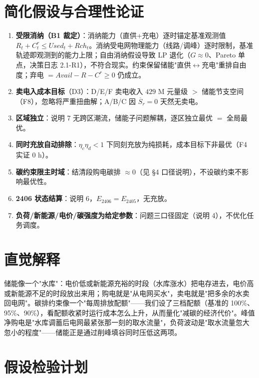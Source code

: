 \documentclass{internal-report}
\begin{document}
\section{简化假设与合理性论证}

\begin{enumerate}
  \item \textbf{受限消纳（B1 裁定）}：消纳能力（直供+充电）逐时锚定基准观测值 $R_t+C^r_t \le Used_t+Rch_t$。消纳受电网物理能力（线路/调峰）逐时限制，基准轨迹即观测到的能力上限；自由消纳假设导致 LP 退化（$G\approx0$、Pareto 单点，决策日志 2.1-R1），不符合现实。约束保留储能"直供$\leftrightarrow$充电"重排自由度；弃电 $=Avail-R-C^r\ge0$ 仍成立。
  \item \textbf{卖电入成本目标}（D3）：D/E/F 卖电收入 $429$ M 元量级 $>$ 储能节支空间（F8），忽略将严重扭曲解；A/B/C 因 $\overline{S}_r=0$ 天然无卖电。
  \item \textbf{区域独立}：说明 7 无跨区潮流，储能子问题解耦，逐区独立最优 $=$ 全局最优。
  \item \textbf{同时充放自动排除}：$\eta_c\eta_d<1$ 下同刻充放为纯损耗，成本目标下非最优（F4 实证 0 h）。
  \item \textbf{碳约束限主时域}：结清段购电碳排 $\approx 0$（见 \S4 口径说明），不设碳约束不影响最优性。
  \item \textbf{2406 状态结算}：说明 6，$E_{2406}=E_{2405}$，无充放。
  \item \textbf{负荷/新能源/电价/碳强度为给定参数}：问题三口径固定（说明 4），不优化任务调度。
\end{enumerate}

\section{直觉解释}

储能像一个"水库"：电价低或新能源充裕的时段（水库涨水）把电存进去，电价高或新能源不足的时段放出来用；购电就是"从电网买水"，卖电就是"把多余的水卖回电网"。碳排约束像一个"每周排放配额"——我们设了三档配额（基准的 100\%、95\%、90\%），看配额收紧时运行成本怎么上升，从而量化"减碳的经济代价"。峰值净购电是"水库调蓄后电网最紧张那一刻的取水流量"，负荷波动是"取水流量忽大忽小的程度"——储能正是通过削峰填谷同时压低这两项。

\section{假设检验计划}
\end{document}
